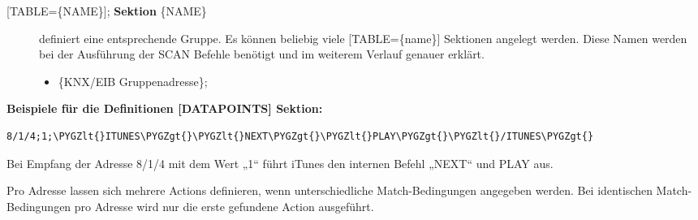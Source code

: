 \documentclass[letterpaper,10pt,english]{sphinxmanual}
\def\PYGZlt{\char`\<}
\def\PYGZgt{\char`\>}
\begin{document}
\begin{quote}
\begin{quote}
\begin{itemize}
\begin{description}
\end{description}

\end{itemize}
\end{quote}
\end{quote}

\begin{DUlineblock}{0em}
\item[] 
\end{DUlineblock}
\begin{description}
\item[{{[}TABLE=\{NAME\}{]}; \textbf{Sektion} \{NAME\}}] \leavevmode
definiert eine entsprechende Gruppe.
Es können beliebig viele {[}TABLE=\{name\}{]} Sektionen angelegt werden.
Diese Namen werden bei der Ausführung der SCAN Befehle benötigt und im weiterem Verlauf genauer erklärt.
\begin{itemize}
\item {} \begin{description}
\item[{\{KNX/EIB Gruppenadresse\};}] \leavevmode
{}

\end{description}

\end{itemize}

\end{description}

\begin{DUlineblock}{0em}
\item[] 
\end{DUlineblock}

\textbf{Beispiele für die Definitionen {[}DATAPOINTS{]} Sektion:}

\begin{Verbatim}[commandchars=\\\{\}]
8/1/4;1;\PYGZlt{}ITUNES\PYGZgt{}\PYGZlt{}NEXT\PYGZgt{}\PYGZlt{}PLAY\PYGZgt{}\PYGZlt{}/ITUNES\PYGZgt{}
\end{Verbatim}

\begin{DUlineblock}{0em}
\item[] Bei Empfang der Adresse 8/1/4 mit dem Wert „1“ führt iTunes den internen Befehl „NEXT“ und PLAY aus.
\item[] Pro Adresse lassen sich mehrere Actions definieren, wenn unterschiedliche Match-Bedingungen angegeben werden. Bei identischen Match-Bedingungen pro Adresse wird nur die erste gefundene Action ausgeführt.
\end{DUlineblock}
\end{document}
